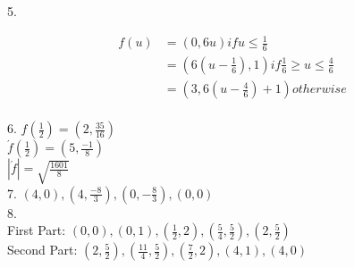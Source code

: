 \documentclass[11pt]{article}
\begin{document}
5.

	\begin{align*}
	f(u) &= (0,6u) if u \le \frac{1}{6} \\
			 &= (6(u-\frac{1}{6}),1) if \frac{1}{6} \ge u \le \frac{4}{6} \\
			 &= (3,6(u-\frac{4}{6}) + 1 ) otherwise \\
	\end{align*}

6. $f(\frac{1}{2}) = (2, \frac{35}{16})$\\
	 $\acute{f}(\frac{1}{2}) = (5, \frac{-1}{8})$\\
	 $|\acute{f}| = \sqrt{\frac{1601}{8}}$\\

7. $(4, 0), (4, \frac{-8}{3}), (0, -\frac{8}{3}), (0, 0)$\\

8. \\
	First Part: $(0, 0), (0, 1), (\frac{1}{2}, 2), (\frac{5}{4}, \frac{5}{2}), (2, \frac{5}{2})$ \\
	Second Part: $(2, \frac{5}{2}), (\frac{11}{4}, \frac{5}{2}), (\frac{7}{2}, 2), (4, 1), (4, 0)$ 
\end{document}
